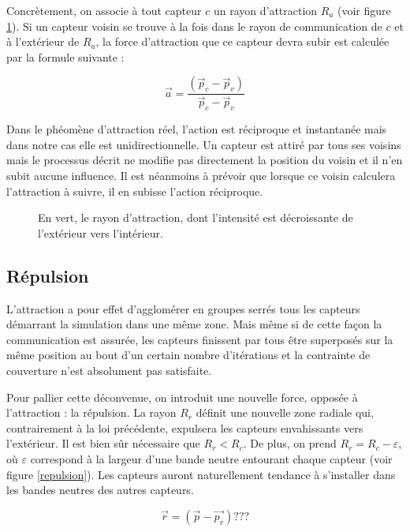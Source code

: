 \documentclass[10pt]{article}
\begin{document}
\begin{multicols}{2}
Concrètement, on associe à tout capteur $c$ un rayon d'attraction
$R_a$ (voir figure \ref{attraction}). Si un capteur voisin se trouve à
la fois dans le rayon de communication de $c$ et à l'extérieur de
$R_a$, la force d'attraction que ce capteur devra subir est calculée
par la formule suivante :

$$
\vec{a} = \frac{(\vec{p}_c - \vec{p}_v)}{\vec{p}_c - \vec{p}_v}
$$

Dans le phéomène d'attraction réel, l'action est réciproque et
instantanée mais dans notre cas elle est unidirectionnelle. Un capteur
est attiré par tous ses voisins mais le processus décrit ne modifie
pas directement la position du voisin et il n'en subit aucune
influence. Il est néanmoins à prévoir que lorsque ce voisin calculera
l'attraction à suivre, il en subisse l'action réciproque.

\begin{figure}[H]

  \centering

  

  \caption{En vert, le rayon d'attraction, dont l'intensité est
    décroissante de l'extérieur vers l'intérieur.}
  \label{attraction}

\end{figure}

\subsection{Répulsion}

L'attraction a pour effet d'agglomérer en groupes serrés tous les
capteurs démarrant la simulation dans une même zone. Mais même si de
cette façon la communication est assurée, les capteurs finissent par
tous être superposés sur la même position au bout d'un certain nombre
d'itérations et la contrainte de couverture n'est absolument pas
satisfaite.

Pour pallier cette déconvenue, on introduit une nouvelle force,
opposée à l'attraction : la répulsion. La rayon $R_r$ définit une
nouvelle zone radiale qui, contrairement à la loi précédente,
expulsera les capteurs envahissants vers l'extérieur. Il est bien sûr
nécessaire que $R_r < R_c$. De plus, on prend $R_r = R_c -
\varepsilon$, o\`u $\varepsilon$ correspond à la largeur d'une bande
neutre entourant chaque capteur (voir figure \ref{repulsion}). Les
capteurs auront naturellement tendance à s'installer dans les bandes
neutres des autres capteurs.

$$
\vec{r} = (\vec{p} - \vec{p_v}) ???
$$



\end{multicols}
\end{document}
